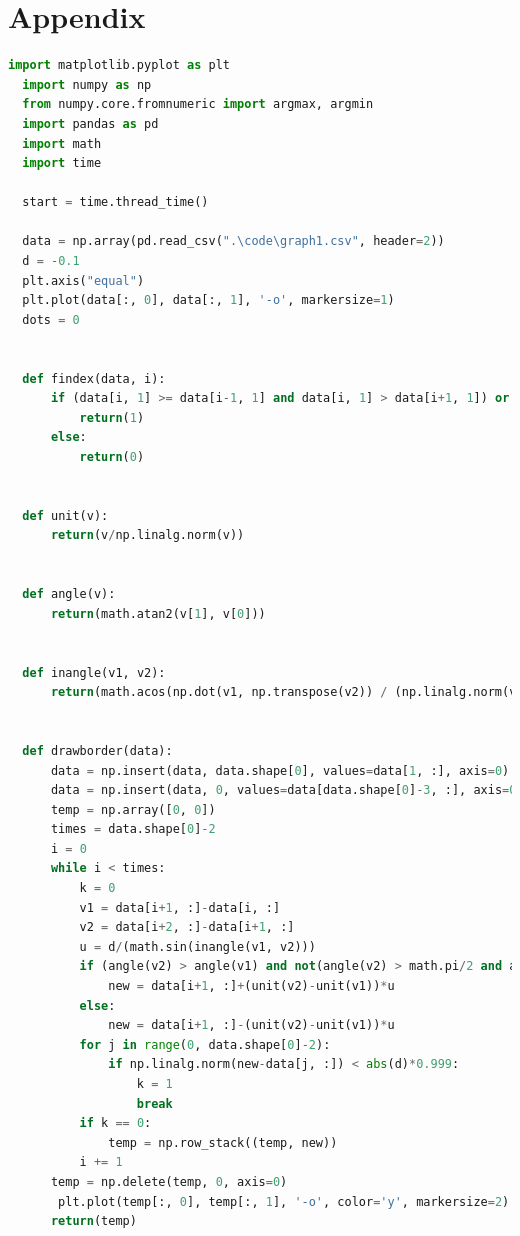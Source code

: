 \documentclass{apmcmthesis}
\begin{document}
\section{Appendix}
\begin{lstlisting}[language=Python,caption={The python Source code of contour parallel hatch}]
  import matplotlib.pyplot as plt 
  import numpy as np
  from numpy.core.fromnumeric import argmax, argmin
  import pandas as pd
  import math
  import time
  
  start = time.thread_time()
  
  data = np.array(pd.read_csv(".\code\graph1.csv", header=2))   
  d = -0.1
  plt.axis("equal")
  plt.plot(data[:, 0], data[:, 1], '-o', markersize=1)
  dots = 0
  
  
  def findex(data, i):   
      if (data[i, 1] >= data[i-1, 1] and data[i, 1] > data[i+1, 1]) or (data[i, 1] <= data[i-1, 1] and data[i, 1] < data[i+1, 1]):
          return(1)
      else:
          return(0)
  
  
  def unit(v):   
      return(v/np.linalg.norm(v))
  
  
  def angle(v):   
      return(math.atan2(v[1], v[0]))
  
  
  def inangle(v1, v2):   
      return(math.acos(np.dot(v1, np.transpose(v2)) / (np.linalg.norm(v1)*np.linalg.norm(v2))))
  
  
  def drawborder(data):   
      data = np.insert(data, data.shape[0], values=data[1, :], axis=0)
      data = np.insert(data, 0, values=data[data.shape[0]-3, :], axis=0)
      temp = np.array([0, 0])
      times = data.shape[0]-2
      i = 0
      while i < times:
          k = 0
          v1 = data[i+1, :]-data[i, :]
          v2 = data[i+2, :]-data[i+1, :]
          u = d/(math.sin(inangle(v1, v2)))
          if (angle(v2) > angle(v1) and not(angle(v2) > math.pi/2 and angle(v1) < -math.pi/2)) or (angle(v2) < -math.pi/2 and angle(v1) > math.pi/2):
              new = data[i+1, :]+(unit(v2)-unit(v1))*u
          else:
              new = data[i+1, :]-(unit(v2)-unit(v1))*u
          for j in range(0, data.shape[0]-2):
              if np.linalg.norm(new-data[j, :]) < abs(d)*0.999:
                  k = 1
                  break
          if k == 0:
              temp = np.row_stack((temp, new))
          i += 1
      temp = np.delete(temp, 0, axis=0)
       plt.plot(temp[:, 0], temp[:, 1], '-o', color='y', markersize=2)
      return(temp)
  

\end{lstlisting}
\end{document}
